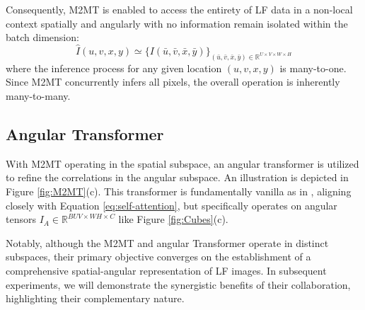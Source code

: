 Consequently, M2MT is enabled to access the entirety of LF data in a non-local context spatially and angularly with no information remain isolated within the batch dimension:
\begin{equation}
    \hat{I}(u, v, x, y) \simeq \{I(\bar{u}, \bar{v}, \bar{x}, \bar{y})\}_{(\bar{u}, \bar{v}, \bar{x}, \bar{y}) \in \mathbb{R}^{U \times V \times W \times H}}
\end{equation}
where the inference process for any given location $(u, v, x, y)$ is many-to-one. Since M2MT concurrently infers all pixels, the overall operation is inherently many-to-many.





\subsection{Angular Transformer}
With M2MT operating in the spatial subspace, an angular transformer is utilized to refine the correlations in the angular subspace. An illustration is depicted in Figure \ref{fig:M2MT}(c). This transformer is fundamentally vanilla as in \cite{liangLFT_SPL2022,wangDPT_AAAI2022}, aligning closely with Equation \ref{eq:self-attention}, but specifically operates on angular tensors $I_{A} \in \mathbb{R}^{BUV \times WH \times C}$ like Figure \ref{fig:Cubes}(c).

Notably, although the M2MT and angular Transformer operate in distinct subspaces, their primary objective converges on the establishment of a comprehensive spatial-angular representation of LF images. In subsequent experiments, we will demonstrate the synergistic benefits of their collaboration, highlighting their complementary nature.